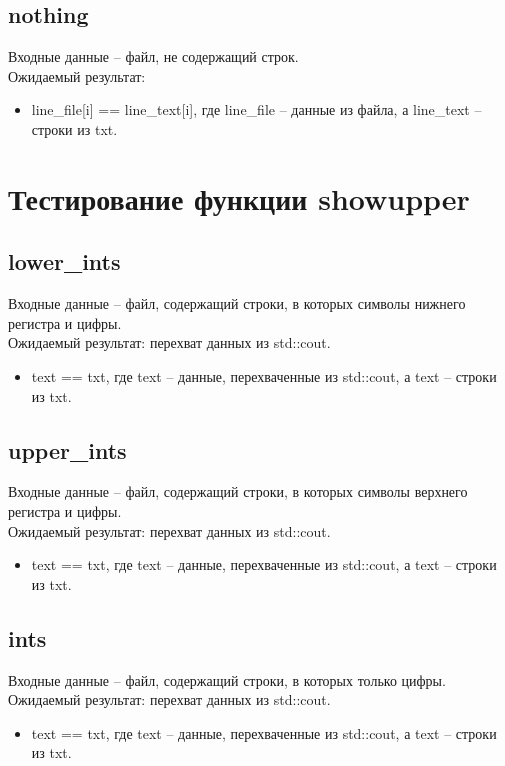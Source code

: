 \documentclass{article}
\begin{document}
\subsection{nothing}
Входные данные -- файл, не содержащий строк.\\
Ожидаемый результат: 
\begin{itemize}
    \item line\_file[i] == line\_text[i], где line\_file -- данные из файла, а line\_text -- строки из txt.
\end{itemize}
\newpage

\section{Тестирование функции showupper}
\subsection{lower\_ints}
Входные данные -- файл, содержащий строки, в которых символы нижнего регистра и цифры.\\
Ожидаемый результат: перехват данных из std::cout.
\begin{itemize}
    \item text == txt, где text -- данные, перехваченные из std::cout, а text -- строки из txt.
\end{itemize}
\subsection{upper\_ints}
Входные данные -- файл, содержащий строки, в которых символы верхнего регистра и цифры.\\
Ожидаемый результат: перехват данных из std::cout.
\begin{itemize}
    \item text == txt, где text -- данные, перехваченные из std::cout, а text -- строки из txt.
\end{itemize}
\subsection{ints}
Входные данные -- файл, содержащий строки, в которых только цифры.\\
Ожидаемый результат: перехват данных из std::cout.
\begin{itemize}
    \item text == txt, где text -- данные, перехваченные из std::cout, а text -- строки из txt.
\end{itemize}
\end{document}
